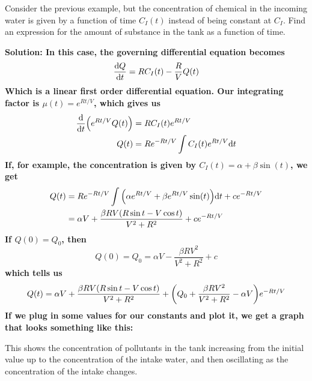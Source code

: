\begin{example}
    Consider the previous example, but the concentration of chemical in the incoming water is given by a function of time $C_I(t)$ instead of being constant at $C_I$. Find an expression for the amount of substance in the tank as a function of time. \par
    \bf{Solution:} In this case, the governing differential equation becomes 
    \[ \dv{Q}{t} = RC_I(t) - \frac{R}{V}Q(t) \]
    Which is a linear first order differential equation. Our integrating factor is $\mu(t) = e^{Rt/V}$, which gives us
    \begin{align*}
        \dv{t}\pqty{e^{Rt/V}Q(t)} &= RC_I(t)e^{Rt/V} \\
        Q(t) &= Re^{-Rt/V}\int C_I(t)e^{Rt/V}\dd t
    \end{align*}
    If, for example, the concentration is given by $C_I(t) = \alpha + \beta\sin(t)$, we get
    \begin{align*}
        Q(t) &= Re^{-Rt/V}\int \pqty{\alpha e^{Rt/V} + \beta e^{Rt/V}\sin(t)}\dd t + ce^{-Rt/V} \\
        &= \alpha V + \frac{\beta RV (R\sin t - V\cos t)}{V^2+R^2} + ce^{-Rt/V}
    \end{align*}
    If $Q(0) = Q_0$, then
    \[ Q(0) = Q_0 = \alpha V - \frac{\beta RV^2}{V^2+R^2} + c \]
    which tells us
    \[ Q(t) = \alpha V + \frac{\beta RV (R\sin t - V\cos t)}{V^2+R^2} + \pqty{Q_0 + \frac{\beta RV^2}{V^2+R^2}- \alpha V} e^{-Rt/V}\]
    If we plug in some values for our constants and plot it, we get a graph that looks something like this:
    \begin{figure}[h!]
        \centering
    \end{figure}
    This shows the concentration of pollutants in the tank increasing from the initial value up to the concentration of the intake water, and then oscillating as the concentration of the intake changes.
\end{example}
